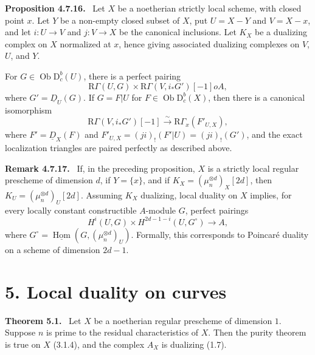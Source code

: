 \documentclass[12pt]{article}
\newcommand{\Hom}{\operatorname{Hom}}
\newcommand{\ob}{\operatorname{Ob}}
\newcommand{\D}{\mathrm D}
\newcommand{\R}{\mathrm R}
\newenvironment{statement}[1]{\par\medskip\noindent\textbf{#1.}\ }{\par\medskip}
\begin{document}
\begin{statement}{Proposition 4.7.16}
Let $X$ be a noetherian strictly local scheme, with closed point $x$. Let $Y$ be a non-empty closed subset of $X$, put $U=X-Y$ and $V=X-x$, and let $i:U\to V$ and $j:V\to X$ be the canonical inclusions. Let $K_X$ be a dualizing complex on $X$ normalized at $x$, hence giving associated dualizing complexes on $V$, $U$, and $Y$.

For $G\in\ob\D_c^b(U)$, there is a perfect pairing
\[
   \R\Gamma(U,G)\times\R\Gamma(V,i_*G')[-1]	o A,
\]
where $G'=\underline D_U(G)$. If $G=F|U$ for $F\in\ob\D_c^b(X)$, then there is a canonical isomorphism
\[
   \R\Gamma(V,i_*G')[-1]\xrightarrow{\sim}\R\Gamma_x(F'_{U,X}),
\]
where $F'=\underline D_X(F)$ and $F'_{U,X}=(ji)_!(F'|U)=(ji)_!(G')$, and the exact localization triangles are paired perfectly as described above.
\end{statement}

\begin{statement}{Remark 4.7.17}
If, in the preceding proposition, $X$ is a strictly local regular prescheme of dimension $d$, if $Y=\{x\}$, and if $K_X=(\mu_n^{\otimes d})_X[2d]$, then $K_U=(\mu_n^{\otimes d})_U[2d]$. Assuming $K_X$ dualizing, local duality on $X$ implies, for every locally constant constructible $A$-module $G$, perfect pairings
\[
   H^i(U,G)\times H^{2d-1-i}(U,G^\circ)\longrightarrow A,
\]
where $G^\circ=\underline{\Hom}(G,(\mu_n^{\otimes d})_U)$. Formally, this corresponds to Poincaré duality on a scheme of dimension $2d-1$.
\end{statement}

\section*{5. Local duality on curves}

\begin{statement}{Theorem 5.1}
Let $X$ be a noetherian regular prescheme of dimension $1$. Suppose $n$ is prime to the residual characteristics of $X$. Then the purity theorem is true on $X$ (3.1.4), and the complex $A_X$ is dualizing (1.7).
\end{statement}
\end{document}
